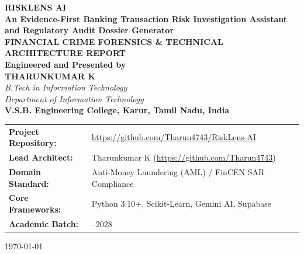 \documentclass[12pt,a4paper]{report}
\begin{document}
\begin{titlepage}
    \centering
    \vspace*{0.8cm}
    
    {\Huge \textbf{RISKLENS AI}}\\[0.3cm]
    {\LARGE \textbf{An Evidence-First Banking Transaction Risk Investigation Assistant and Regulatory Audit Dossier Generator}}\\[1.2cm]
    
    {\large \textbf{FINANCIAL CRIME FORENSICS \& TECHNICAL ARCHITECTURE REPORT}}\\[1.0cm]
    
    \textbf{Engineered and Presented by}\\[0.3cm]
    {\Large \textbf{THARUNKUMAR K}}\\[0.2cm]
    \textit{B.Tech in Information Technology}\\[0.1cm]
    \textit{Department of Information Technology}\\[0.2cm]
    \textbf{V.S.B. Engineering College, Karur, Tamil Nadu, India}\\[1.5cm]
    
    \vfill
    
    \begin{tabular}{>{\raggedright\arraybackslash\bfseries}p{4.2cm}>{\raggedright\arraybackslash}p{10.2cm}}
        Project Repository: & \url{https://github.com/Tharun4743/RiskLens-AI} \\
        Lead Architect: & Tharunkumar K (\url{https://github.com/Tharun4743}) \\
        Domain Standard: & Anti-Money Laundering (AML) / FinCEN SAR Compliance \\
        Core Frameworks: & Python 3.10+, Scikit-Learn, Gemini AI, Supabase \\
        Academic Batch: & 2024--2028 \\
    \end{tabular}
    
    \vspace*{0.8cm}
    {\small \today}
\end{titlepage}

\cleardoublepage
{}
\setcounter{page}{1}
\end{document}
